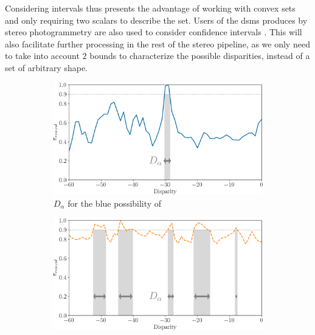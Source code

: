Considering intervals thus presents the advantage of working with convex sets and only requiring two scalars to describe the set. Users of the \acrshort{dsm}s produces by stereo photogrammetry are also used to consider confidence intervals \cite{oksanen_digital_2006, wang_robust_2015, panagiotakis_validation_2018, deschamps-berger_apport_2021, hugonnet_uncertainty_2022}. This will also facilitate further processing in the rest of the stereo pipeline, as we only need to take into account $2$ bounds to characterize the possible disparities, instead of a set of arbitrary shape.

\begin{figure}
    \centering
    \begin{subfigure}[t]{0.47\linewidth}
        \centering
        \includegraphics[width=\linewidth]{Images/Chap_5/disparity_interval_1.png}
        \caption{$D_\alpha$ for the blue possibility of }
        \label{fig:disparity_intervals_a}
    \end{subfigure}\hfill
    \begin{subfigure}[t]{0.47\linewidth}
        \centering
        \includegraphics[width=\linewidth]{Images/Chap_5/disparity_interval_2.png}

\end{subfigure}
\end{figure}
